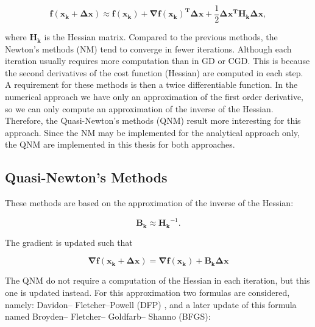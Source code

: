 \begin{equation}
\mathbf{f(x_k + \Delta x) }\approx \mathbf{f(x_k) } + \mathbf{\nabla f(x_k)^{T} }\mathbf{\Delta x} + \frac{1}{2} \mathbf{\Delta x^{T} }\mathbf{H_k} \mathbf{\Delta x},
\end{equation}

where $\mathbf{H_k}$ is the Hessian matrix.  Compared to the previous methods, the Newton's methods (NM) tend to converge in fewer iterations. Although each iteration usually requires more computation than  in GD or CGD. This is because the second derivatives of the cost function (Hessian) are computed in each step. \\
A requirement for these methods is then a twice differentiable function.  
In the numerical approach we have only  an approximation of the first order derivative, so  we can only compute an approximation of the inverse of the Hessian. Therefore, the Quasi-Newton's methods (QNM) result more interesting for this approach. Since the NM may be implemented for the analytical approach only, the QNM are implemented in this thesis for both approaches.


\subsection{Quasi-Newton's Methods}
\label{subsec:quasinewton}


 
These methods are based on the approximation of the inverse of the Hessian:

\begin{equation}
\mathbf{B_k} \approx \mathbf{H_k}^{-1}. 
\end{equation}

The gradient is updated such that

\begin{equation}
\mathbf{\nabla f(x_k + \Delta x)} = \mathbf{\nabla f(x_k) + \mathbf{B_k}\mathbf{ \Delta x }} 
\end{equation}



The QNM do not require a computation of the Hessian in each iteration, but this one is updated instead.
For this approximation two formulas are considered, namely: Davidon–
Fletcher–Powell (DFP) \cite{DFP}, and a later update of this formula named Broyden– Fletcher– Goldfarb– Shanno (BFGS)\cite{BFGS}:

